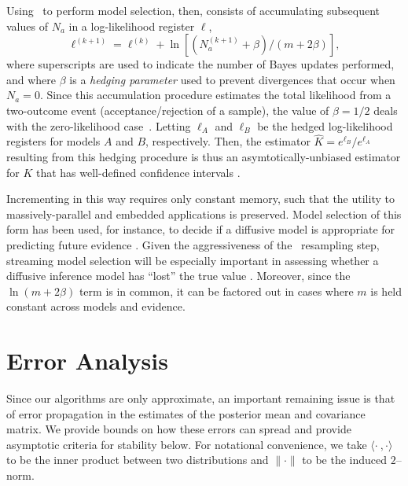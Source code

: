 \documentclass[twoside]{article}
\newcommand{\CRej}{\text{rejection filtering}}
\begin{document}
Using \CRej~to perform model selection, then, consists of accumulating
subsequent values of $N_a$ in a log-likelihood register $\ell$,
\begin{equation}
    \ell^{(k + 1)} = \ell^{(k)} + \ln\left[(N_a^{(k + 1)} + \beta) / (m + 2 \beta)\right],
\end{equation}
where superscripts are used to indicate the number of Bayes updates performed,
and where $\beta$ is a \emph{hedging parameter} used to prevent
divergences that occur when $N_a = 0$. Since this accumulation procedure
estimates the total likelihood from a two-outcome event
(acceptance/rejection of a sample), the value of $\beta = 1 / 2$ deals with the zero-likelihood case~\cite{ferrie_estimating_2012}.
Letting $\ell_A$ and $\ell_B$ be the hedged log-likelihood registers for models $A$ and $B$,
respectively. Then, the estimator $\hat{K} = e^{\ell_B} / e^{\ell_A}$ resulting from this hedging procedure
is thus an asymtotically-unbiased estimator for $K$ that has well-defined
confidence intervals \cite{cho_approximate_2013}.


Incrementing in this way requires only constant memory, such that the utility
to massively-parallel and embedded applications is preserved.
Model selection of this form has been used, for instance, to decide if
a diffusive model is appropriate for predicting future evidence \cite{granade_characterization_2015}.
Given the aggressiveness of the \CRej~resampling step, streaming model selection
will be especially important in assessing whether a diffusive inference model has
``lost'' the true value \cite{wiebe_efficient_2015}. Moreover, since the $\ln(m + 2\beta)$ term is in common,
it can be factored out in cases where $m$ is held constant across models and evidence.

\section{Error Analysis}
\label{sec:error-analysis}

Since our algorithms are only approximate, an important remaining issue is that of error propagation in the estimates of the posterior mean
and covariance matrix.  We provide bounds on how these errors can spread and provide asymptotic criteria for stability below.  For notational convenience,
we take $\langle \cdot\!~,\cdot \rangle$ to be the inner product between two distributions and $\|\cdot\|$ to be the induced $2$--norm.
\end{document}
